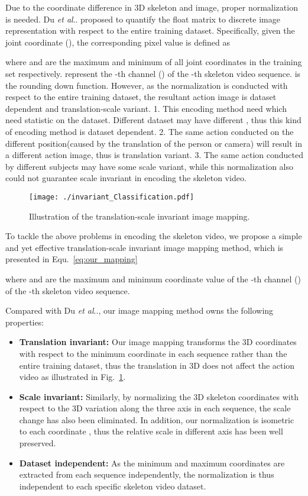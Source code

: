 \documentclass[10pt,journal]{IEEEtran}
\makeatletter
\DeclareRobustCommand\onedot{\futurelet\@let@token\@onedot}
\def\@onedot{\ifx\@let@token.\else.\null\fi\xspace}
\def\etal{\emph{et al}\onedot}
\makeatother
\begin{document}
Due to the coordinate difference in 3D skeleton and image, proper normalization is needed. Du \etal \cite{Yong2015Skeleton} proposed to quantify the float matrix to discrete image representation with respect to the entire training dataset. Specifically, given the joint coordinate  (), the corresponding pixel value  is defined as

where  and  are the maximum and minimum of all joint coordinates in the training set respectively.  represent the -th channel () of the -th skeleton video sequence.  is the rounding down function. However, as the normalization is conducted with respect to the entire training dataset, the resultant action image is dataset dependent and translation-scale variant.  1. This encoding method need  which need statistic on the dataset. Different dataset may have different , thus this kind of encoding method is dataset dependent. 2. The same action conducted on the different position(caused by the translation of the person or camera) will result in a different action image, thus is translation variant. 3. The same action conducted by different subjects may have some scale variant, while this normalization also could not guarantee scale invariant in encoding the skeleton video.


\begin{figure}[htb]
\centering
\texttt{[image: ./invariant\_Classification.pdf]}
\caption{Illustration of the translation-scale invariant image mapping.}
\label{fig:map}
\end{figure}

To tackle the above problems in encoding the skeleton video, we propose a simple and yet effective translation-scale invariant image mapping method, which is presented in Equ.~\ref{eq:our_mapping}

where  and  are the maximum and minimum coordinate value of the -th channel () of the -th skeleton video sequence.

Compared with Du \etal \cite{Yong2015Skeleton}, our image mapping method owns the following properties:
\begin{itemize}
  \item \textbf{Translation invariant:} Our image mapping transforms the 3D coordinates with respect to the minimum coordinate in each sequence rather than the entire training dataset, thus the translation in 3D does not affect the action video as illustrated in Fig.~\ref{fig:map}.
  \item \textbf{Scale invariant:} Similarly, by normalizing the 3D skeleton coordinates with respect to the 3D variation along the three axis in each sequence, the scale change has also been eliminated. In addition, our normalization is isometric to each coordinate , thus the relative scale in different axis has been well preserved.
  \item \textbf{Dataset independent:} As the minimum and maximum coordinates are extracted from each sequence independently, the normalization is thus independent to each specific skeleton video dataset. 
\end{itemize}
\end{document}
